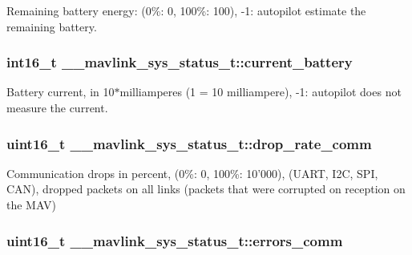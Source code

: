 Remaining battery energy\+: (0\%\+: 0, 100\%\+: 100), -\/1\+: autopilot estimate the remaining battery. 

\hypertarget{struct____mavlink__sys__status__t_a78ab5021909544c255827e8b2bd23034}{
\subsubsection[{current\+\_\+battery}]{\setlength{\rightskip}{0pt plus 5cm}int16\+\_\+t \+\_\+\+\_\+mavlink\+\_\+sys\+\_\+status\+\_\+t\+::current\+\_\+battery}}\label{struct____mavlink__sys__status__t_a78ab5021909544c255827e8b2bd23034}


Battery current, in 10$\ast$milliamperes (1 = 10 milliampere), -\/1\+: autopilot does not measure the current. 

\hypertarget{struct____mavlink__sys__status__t_a08c165a0dcb2a852605e8abaaf9dfd78}{
\subsubsection[{drop\+\_\+rate\+\_\+comm}]{\setlength{\rightskip}{0pt plus 5cm}uint16\+\_\+t \+\_\+\+\_\+mavlink\+\_\+sys\+\_\+status\+\_\+t\+::drop\+\_\+rate\+\_\+comm}}\label{struct____mavlink__sys__status__t_a08c165a0dcb2a852605e8abaaf9dfd78}


Communication drops in percent, (0\%\+: 0, 100\%\+: 10'000), (U\+A\+R\+T, I2\+C, S\+P\+I, C\+A\+N), dropped packets on all links (packets that were corrupted on reception on the M\+A\+V) 

\hypertarget{struct____mavlink__sys__status__t_af144d0a152da70babf5ec86593e88700}{
\subsubsection[{errors\+\_\+comm}]{\setlength{\rightskip}{0pt plus 5cm}uint16\+\_\+t \+\_\+\+\_\+mavlink\+\_\+sys\+\_\+status\+\_\+t\+::errors\+\_\+comm}}\label{struct____mavlink__sys__status__t_af144d0a152da70babf5ec86593e88700}



